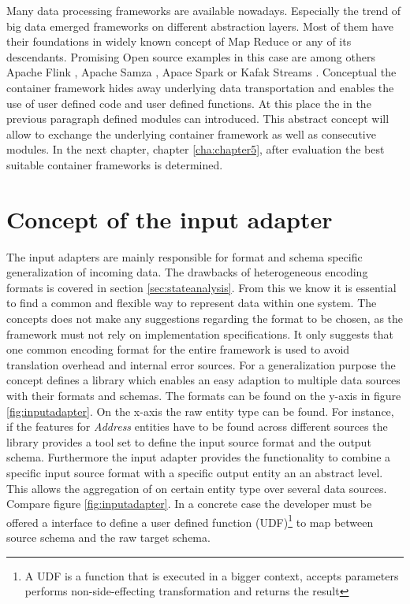 Many data processing frameworks are available nowadays. Especially the trend of big data emerged frameworks on different abstraction layers. Most of them have their foundations in widely known concept of Map Reduce
or any of its descendants. Promising Open source examples in this case are among others Apache Flink
, Apache Samza
, Apace Spark
or Kafak Streams
%
. Conceptual the container framework hides away underlying data transportation and enables the use of user defined code and user defined functions. At this place the in the previous paragraph defined modules can introduced. This abstract concept will allow to exchange the underlying container framework as well as consecutive modules. In the next chapter, chapter \ref{cha:chapter5}, after evaluation the best suitable container frameworks is determined.

\section{Concept of the input adapter \label{sec:inputadapter}}

The input adapters are mainly responsible for format and schema specific generalization of incoming data. The drawbacks of heterogeneous encoding formats is covered in section \ref{sec:stateanalysis}. From this we know it is essential to find a common and flexible way to represent data within one system. The concepts does not make any suggestions regarding the format to be chosen, as the framework must not rely on implementation specifications. It only suggests that one common encoding format for the entire framework is used to avoid translation overhead and internal error sources. For a generalization purpose the concept defines a library which enables an easy adaption to multiple data sources with their formats and schemas. The formats can be found on the y-axis in figure \ref{fig:inputadapter}. On the x-axis the raw entity type can be found. For instance, if the features for \textit{Address} entities have to be found across different sources the library provides a tool set to define the input source format and the output schema. Furthermore the input adapter provides the functionality to combine a specific input source format with a specific output entity an an abstract level. This allows the aggregation of on certain entity type over several data sources. Compare figure \ref{fig:inputadapter}. In a concrete case the developer must be offered a interface to define a user defined function (UDF)\footnote{A UDF is a function that is executed in a bigger context, accepts parameters performs non-side-effecting transformation and returns the result} to map between source schema and the raw target schema. 

